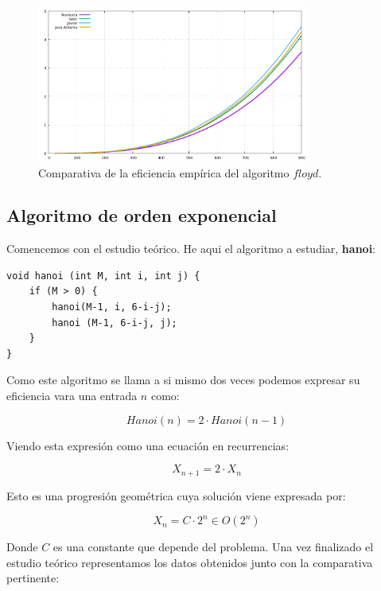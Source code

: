 \documentclass[11pt,a4paper]{article}
\begin{document}
\begin{figure}[H]
	\centering
	\includegraphics[width=0.8\textwidth]{../plots/floyd}
	\caption{Comparativa de la eficiencia empírica del algoritmo $floyd$.}
\end{figure}

\subsection{Algoritmo de orden exponencial}

Comencemos con el estudio teórico. He aqui el algoritmo a estudiar, \textbf{hanoi}:

\begin{lstlisting}
void hanoi (int M, int i, int j) {
	if (M > 0) {
		hanoi(M-1, i, 6-i-j);
		hanoi (M-1, 6-i-j, j);
	}
}
\end{lstlisting}

Como este algoritmo se llama a si mismo dos veces podemos expresar su eficiencia vara una entrada $n$ como:

$$Hanoi(n) = 2 \cdot Hanoi(n-1)$$

Viendo esta expresión como una ecuación en recurrencias:

$$X_{n+1} = 2 \cdot X_n$$

Esto es una progresión geométrica cuya solución viene expresada por:

$$X_n = C \cdot 2^n \in O(2^n)$$

Donde $C$ es una constante que depende del problema. Una vez finalizado el estudio teórico representamos los datos obtenidos junto con la comparativa pertinente:
\end{document}
